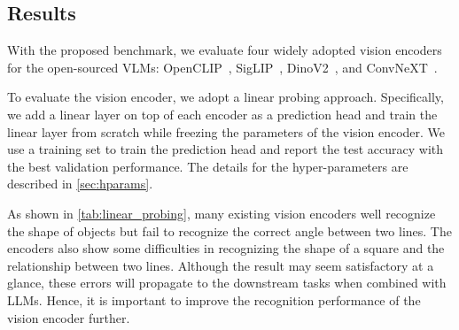 \subsection{Results}
\label{sec:benchmakr_results}



With the proposed benchmark, we evaluate four widely adopted vision encoders for the open-sourced VLMs: OpenCLIP~\citep{clip}, SigLIP~\citep{siglip}, DinoV2~\citep{dinov2}, and ConvNeXT~\citep{convnext}.

To evaluate the vision encoder, we adopt a linear probing approach. Specifically, we add a linear layer on top of each encoder as a prediction head and train the linear layer from scratch while freezing the parameters of the vision encoder. We use a training set to train the prediction head and report the test accuracy with the best validation performance. The details for the hyper-parameters are described in \cref{sec:hparams}.

As shown in \cref{tab:linear_probing}, many existing vision encoders well recognize the shape of objects but fail to recognize the correct angle between two lines. The encoders also show some difficulties in recognizing the shape of a square and the relationship between two lines. Although the result may seem satisfactory at a glance, these errors will propagate to the downstream tasks when combined with LLMs. Hence, it is important to improve the recognition performance of the vision encoder further. 

